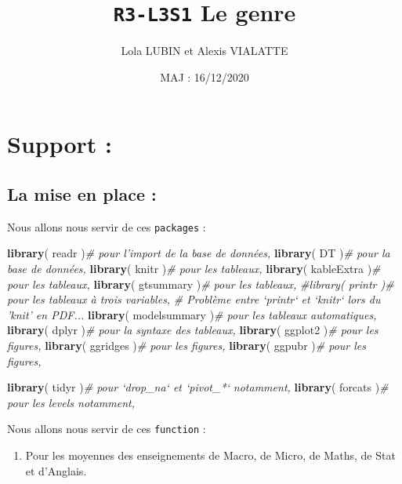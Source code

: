 \documentclass[
  11pt,
  french,
]{article}
\title{\texttt{R3-L3S1} Le genre}
\author{Lola LUBIN et Alexis VIALATTE}
\date{MAJ : 16/12/2020}
\newenvironment{Shaded}{\begin{snugshade}}{\end{snugshade}}
\newcommand{\CommentTok}[1]{\textcolor[rgb]{0.56,0.35,0.01}{\textit{#1}}}
\newcommand{\KeywordTok}[1]{\textcolor[rgb]{0.13,0.29,0.53}{\textbf{#1}}}
\newcommand{\NormalTok}[1]{#1}
\providecommand{\tightlist}{%
  \setlength{\itemsep}{0pt}\setlength{\parskip}{0pt}}
\begin{document}
\maketitle

{
\setcounter{tocdepth}{2}
\tableofcontents
}
\newpage

\hypertarget{support}{%
\section{Support :}\label{support}}

\hypertarget{la-mise-en-place}{%
\subsection{La mise en place :}\label{la-mise-en-place}}

Nous allons nous servir de ces \texttt{packages} :

\begin{Shaded}
\begin{Highlighting}[]
\KeywordTok{library}\NormalTok{( readr )}\CommentTok{# pour l'import de la base de données,}
\KeywordTok{library}\NormalTok{( DT )}\CommentTok{# pour la base de données,}
\KeywordTok{library}\NormalTok{( knitr )}\CommentTok{# pour les tableaux,}
\KeywordTok{library}\NormalTok{( kableExtra )}\CommentTok{# pour les tableaux,}
\KeywordTok{library}\NormalTok{( gtsummary )}\CommentTok{# pour les tableaux,}
\CommentTok{#library( printr )# pour les tableaux à trois variables,}
\CommentTok{# Problème entre `printr` et `knitr` lors du 'knit' en PDF...}
\KeywordTok{library}\NormalTok{( modelsummary )}\CommentTok{# pour les tableaux automatiques,}
\KeywordTok{library}\NormalTok{( dplyr )}\CommentTok{# pour la syntaxe des tableaux,}
\KeywordTok{library}\NormalTok{( ggplot2 )}\CommentTok{# pour les figures,}
\KeywordTok{library}\NormalTok{( ggridges )}\CommentTok{# pour les figures,}
\KeywordTok{library}\NormalTok{( ggpubr )}\CommentTok{# pour les figures,}

\KeywordTok{library}\NormalTok{( tidyr )}\CommentTok{# pour `drop_na` et `pivot_*` notamment,}
\KeywordTok{library}\NormalTok{( forcats )}\CommentTok{# pour les levels notamment,}
\end{Highlighting}
\end{Shaded}

Nous allons nous servir de ces \texttt{function} :

\begin{enumerate}
\def\labelenumi{\arabic{enumi}.}
\tightlist
\item
  Pour les moyennes des enseignements de Macro, de Micro, de Maths, de
  Stat et d'Anglais.
\end{enumerate}
\end{document}
